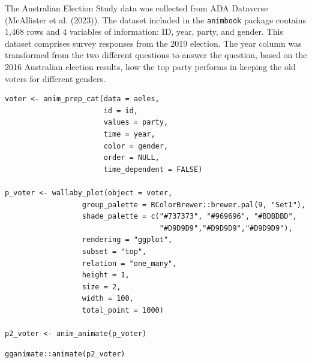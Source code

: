 The Australian Election Study data was collected from ADA Dataverse (McAllister et al. (2023)). The dataset included in the \texttt{animbook} package contains 1,468 rows and 4 variables of information: ID, year, party, and gender. This dataset comprises survey responses from the 2019 election. The year column was transformed from the two different questions to answer the question, based on the 2016 Australian election results, how the top party performs in keeping the old voters for different genders.

\begin{verbatim}
voter <- anim_prep_cat(data = aeles,
                       id = id,
                       values = party,
                       time = year,
                       color = gender,
                       order = NULL,
                       time_dependent = FALSE)

p_voter <- wallaby_plot(object = voter,
                  group_palette = RColorBrewer::brewer.pal(9, "Set1"),
                  shade_palette = c("#737373", "#969696", "#BDBDBD",
                                    "#D9D9D9","#D9D9D9","#D9D9D9"),
                  rendering = "ggplot",
                  subset = "top",
                  relation = "one_many",
                  height = 1,
                  size = 2,
                  width = 100,
                  total_point = 1000)

p2_voter <- anim_animate(p_voter)
\end{verbatim}

\begin{verbatim}
gganimate::animate(p2_voter)
\end{verbatim}

